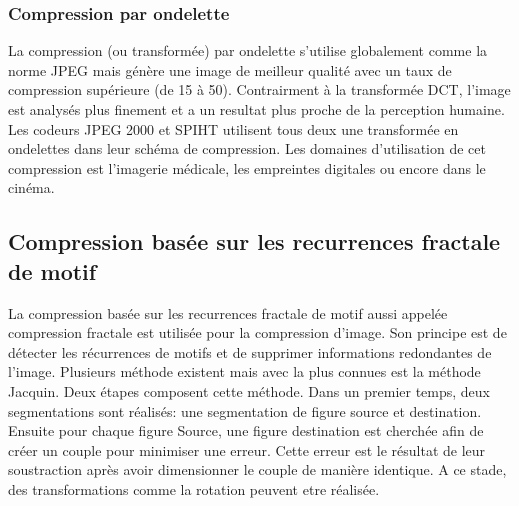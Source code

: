 \documentclass[a4paper]{report}
\begin{document}
	\subsubsection{Compression par ondelette}
		La compression (ou transformée) par ondelette s'utilise globalement comme la norme JPEG mais génère une image de meilleur qualité avec un taux de compression supérieure (de 15 à 50). Contrairment à la transformée DCT, l'image est analysés plus finement et a un resultat plus proche de la perception humaine. Les codeurs JPEG 2000 et SPIHT utilisent tous deux une transformée en ondelettes dans leur schéma de compression. Les domaines d'utilisation de cet compression est l'imagerie médicale, les empreintes digitales ou encore dans le cinéma.

	\subsection{Compression basée sur les recurrences fractale de motif}
		La compression basée sur les recurrences fractale de motif aussi appelée compression fractale est utilisée pour la compression d'image. Son principe est de détecter les récurrences de motifs et de supprimer informations redondantes de l'image. Plusieurs méthode existent mais avec la plus connues est la méthode Jacquin. Deux étapes composent cette méthode. Dans un premier temps, deux segmentations sont réalisés: une segmentation de figure source et destination. Ensuite pour chaque figure Source, une figure destination est cherchée afin de créer un couple pour minimiser une erreur. Cette erreur est le résultat de leur soustraction après avoir dimensionner le couple de manière identique. A ce stade, des transformations comme la rotation peuvent etre réalisée.
		
         
\end{document}
